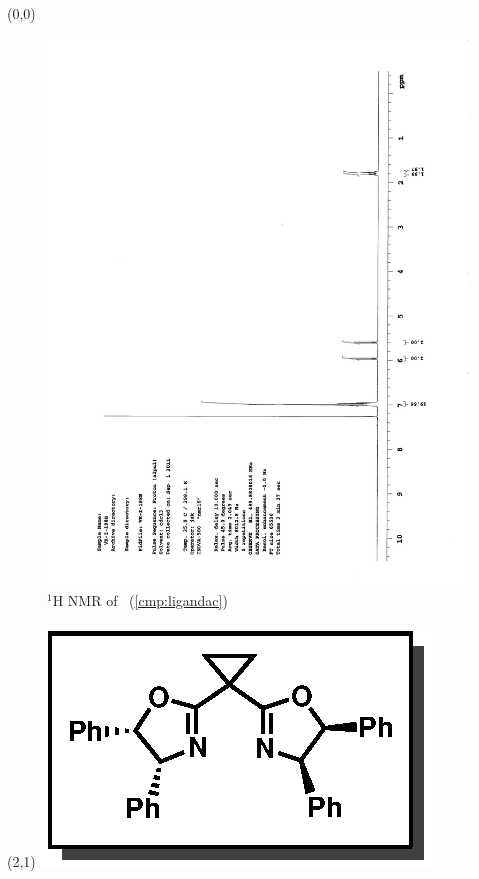 
\begin{textblock}{20}(0,0)
\begin{figure}[htb]
\caption{$^1$H NMR of \CMPligandac\ (\ref{cmp:ligandac})}
\includegraphics[scale=0.75, trim = 0mm 0mm 0mm 5mm,
clip]{chp_asymmetric/images/nmr/ligandacH}
\vspace{-100pt}
\end{figure}
\end{textblock}
\begin{textblock}{1}(2,1)
\includegraphics[scale=0.8, angle=90]{chp_asymmetric/images/ligandac}
\end{textblock}
